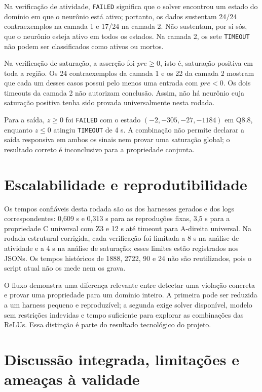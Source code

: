 Na verificação de atividade, \texttt{FAILED} significa que o solver encontrou
um estado do domínio em que o neurônio está ativo; portanto, os dados sustentam
24/24 contraexemplos na camada 1 e 17/24 na camada 2. Não sustentam, por si
sós, que o neurônio esteja ativo em todos os estados. Na camada 2, os sete
\texttt{TIMEOUT} não podem ser classificados como ativos ou mortos.

Na verificação de saturação, a asserção foi \(pre\geq0\), isto é, saturação
positiva em toda a região. Os 24 contraexemplos da camada 1 e os 22 da camada 2
mostram que cada um desses casos possui pelo menos uma entrada com
\(pre<0\). Os dois timeouts da camada 2 não autorizam conclusão. Assim, não há
neurônio cuja saturação positiva tenha sido provada universalmente nesta rodada.

Para a saída, \(z\geq0\) foi \texttt{FAILED} com o estado
\((-2,-305,-27,-1184)\) em Q8.8, enquanto \(z\leq0\) atingiu
\texttt{TIMEOUT} de 4 s. A combinação não permite declarar a saída
responsiva em ambos os sinais nem provar uma saturação global; o resultado
correto é inconclusivo para a propriedade conjunta.

\section{Escalabilidade e reprodutibilidade}

Os tempos confiáveis desta rodada são os dos harnesses gerados e dos logs
correspondentes: 0,609 s e 0,313 s para as reproduções fixas, 3,5 s para a
propriedade C universal com Z3 e 12 s até timeout para A-direita universal.
Na rodada estrutural corrigida, cada verificação foi limitada a 8 s na análise
de atividade e a 4 s na análise de saturação; esses limites estão registrados
nos JSONs. Os tempos históricos de 1888, 2722, 90 e 24 não são reutilizados,
pois o script atual não os mede nem os grava.

O fluxo demonstra uma diferença relevante entre detectar uma violação concreta
e provar uma propriedade para um domínio inteiro. A primeira pode ser reduzida a
um harness pequeno e reproduzível; a segunda exige solver disponível, modelo
sem restrições indevidas e tempo suficiente para explorar as combinações das
ReLUs. Essa distinção é parte do resultado tecnológico do projeto.

\section{Discussão integrada, limitações e ameaças à validade}

